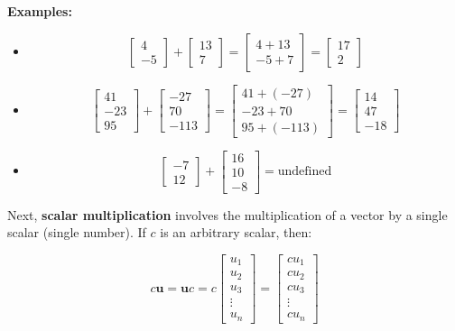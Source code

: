 \documentclass{article}
\begin{document}
\textbf{Examples:}
\begin{itemize}
\item 
\[\begin{bmatrix} 4 \\ -5 \end{bmatrix} + \begin{bmatrix} 13 \\ 7 \end{bmatrix} = \begin{bmatrix} 4 + 13 \\ -5 + 7 \end{bmatrix} = \begin{bmatrix} 17 \\ 2 \end{bmatrix}\]
\item 
\[\begin{bmatrix} 41 \\ -23 \\ 95 \end{bmatrix} + \begin{bmatrix} -27 \\ 70 \\ -113 \end{bmatrix} = \begin{bmatrix} 41 + (-27) \\ -23 + 70 \\ 95 + (-113) \end{bmatrix} = \begin{bmatrix} 14 \\ 47 \\ -18 \end{bmatrix}\]
\item 
\[\begin{bmatrix} -7 \\ 12 \end{bmatrix} + \begin{bmatrix} 16 \\ 10 \\ -8 \end{bmatrix} = \text{undefined}\]
\end{itemize}

Next, {\bf scalar multiplication} involves the multiplication of a vector by a single scalar (single number). If \(c\) is an arbitrary scalar, then:

\[c\mathbf{u} = \mathbf{u} c = c\begin{bmatrix} u_1 \\ u_2 \\ u_3 \\ \vdots \\ u_n \end{bmatrix} = \begin{bmatrix} c u_1  \\ c u_2 \\ c u_3 \\ \vdots \\ c u_n \end{bmatrix}\]
\end{document}
